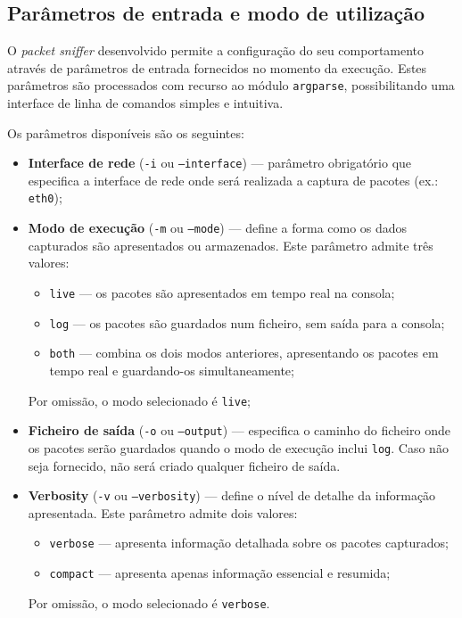 \documentclass[a4paper,12pt]{article}
\begin{document}
\subsection{Parâmetros de entrada e modo de utilização}

O \textit{packet sniffer} desenvolvido permite a configuração do seu comportamento através de parâmetros de entrada fornecidos no momento da execução. Estes parâmetros são processados com recurso ao módulo \texttt{argparse}, possibilitando uma interface de linha de comandos simples e intuitiva.

Os parâmetros disponíveis são os seguintes:

\begin{itemize}
    \item \textbf{Interface de rede} (\texttt{-i} ou \texttt{--interface}) — parâmetro obrigatório que especifica a interface de rede onde será realizada a captura de pacotes (ex.: \texttt{eth0});

    \item \textbf{Modo de execução} (\texttt{-m} ou \texttt{--mode}) — define a forma como os dados capturados são apresentados ou armazenados. Este parâmetro admite três valores:
    \begin{itemize}
        \item \texttt{live} — os pacotes são apresentados em tempo real na consola;
        \item \texttt{log} — os pacotes são guardados num ficheiro, sem saída para a consola;
        \item \texttt{both} — combina os dois modos anteriores, apresentando os pacotes em tempo real e guardando-os simultaneamente;
    \end{itemize}
    Por omissão, o modo selecionado é \texttt{live};

    \item \textbf{Ficheiro de saída} (\texttt{-o} ou \texttt{--output}) — especifica o caminho do ficheiro onde os pacotes serão guardados quando o modo de execução inclui \texttt{log}. Caso não seja fornecido, não será criado qualquer ficheiro de saída.
    
     \item \textbf{Verbosity} (\texttt{-v} ou \texttt{--verbosity}) — define o nível de detalhe da informação apresentada. Este parâmetro admite dois valores:
    \begin{itemize}
        \item \texttt{verbose} — apresenta informação detalhada sobre os pacotes capturados;
        \item \texttt{compact} — apresenta apenas informação essencial e resumida;
    \end{itemize}
    Por omissão, o modo selecionado é \texttt{verbose}.
\end{itemize}
\end{document}
